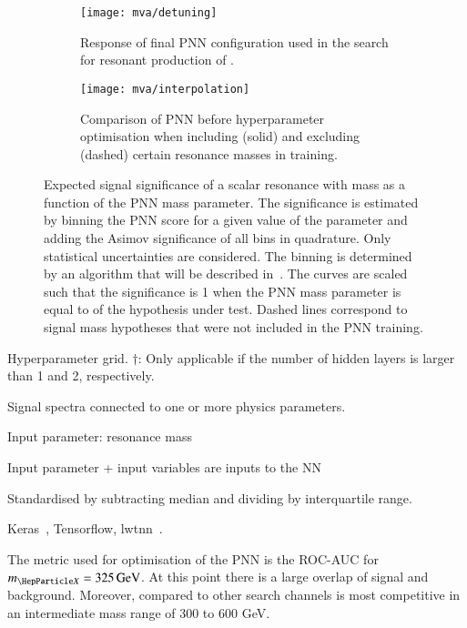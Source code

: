 \begin{figure}[htbp]
  \centering

  \begin{subfigure}[t]{.49\textwidth}
    \texttt{[image: mva/detuning]}
    \caption{Response of final PNN configuration used in the search
      for resonant production of \HH.}
  \end{subfigure}\hfill%
  \begin{subfigure}[t]{.49\textwidth}
    \centering
    \texttt{[image: mva/interpolation]}
    \caption{Comparison of PNN before hyperparameter optimisation when
      including (solid) and excluding (dashed) certain resonance
      masses in training.}
  \end{subfigure}

  \caption{Expected signal significance of a scalar resonance with
    mass \mX as a function of the PNN mass parameter. The significance
    is estimated by binning the PNN score for a given value of the
    parameter and adding the Asimov significance of all bins in
    quadrature. Only statistical uncertainties are considered. The
    binning is determined by an algorithm that will be described
    in~. The curves are scaled such that the
    significance is 1 when the PNN mass parameter is equal to \mX of
    the hypothesis under test. Dashed lines correspond to signal mass
    hypotheses that were not included in the PNN training.}
  \label{fig:pnn_properties}
\end{figure}


\begin{table}[htbp]
  \centering
  
  \caption{Hyperparameter grid. $\dagger$: Only applicable if the
    number of hidden layers is larger than 1 and 2, respectively.}
  \label{tab:hyperparameter_grid_pnn}
\end{table}


Signal spectra connected to one or more physics parameters.

Input parameter: resonance mass \mX

Input parameter + input variables are inputs to the NN

Standardised by subtracting median and dividing by interquartile range.

Keras~\cite{keras}, Tensorflow\cite{tensorflow2015-whitepaper},
lwtnn~\cite{lwtnn}.


The metric used for optimisation of the PNN is the ROC-AUC for
$\mX = \SI{325}{\GeV}$. At this point there is a large overlap of
signal and background. Moreover, compared to other search channels
\bbtautau is most competitive in an intermediate mass range of 300 to
600 GeV.

